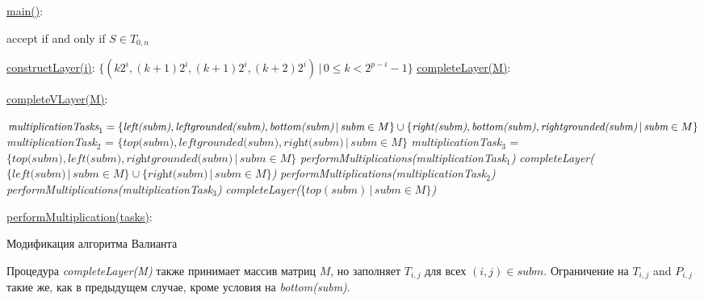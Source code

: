 \documentclass[14pt]{matmex-diploma-custom}
\begin{document}
\begin{algorithm}[!h]
\SetAlgoNoLine
{}
\underline{main()}{:}{

 accept if and only if $S \in T_{0, n}$
 \BlankLine
 }

\underline{constructLayer(i)}{:}{
 \BlankLine
 $\{(k2^i, (k+1)2^i, (k + 1)2^i, (k+2)2^i) \, |\, 0 \le k < 2^{p - i} - 1\}$
 \BlankLine
    }
\underline{completeLayer(M)}{:}{
\BlankLine
{}
\BlankLine
}

\underline{completeVLayer(M)}{:}{
 \BlankLine
 $\textit{multiplicationTasks}_1 = \linebreak
    \{\textit{left(subm)}, \textit{leftgrounded(subm)}, \textit{bottom(subm)}\, 
    |\,\textit{subm} \in M \} \cup \linebreak  \{\textit{right(subm)}, \textit{bottom(subm)}, \textit{rightgrounded(subm)}\, |\,\textit{subm} \in M\}$\;
 \BlankLine
 \textit{multiplicationTask$_2$} = $\{\textit{top(subm)}, \textit{leftgrounded(subm)}, \textit{right(subm)}\, |\,\textit{subm} \in M\}$\;
 \BlankLine
 \textit{multiplicationTask$_3$} = $\{\textit{top(subm)}, \textit{left(subm)}, \textit{rightgrounded(subm)}\, |\,\textit{subm} \in M\}$\;
 \BlankLine
 \textit{performMultiplications(multiplicationTask$_1$)}\;
 \textit{completeLayer($\{\textit{left(subm)}\, |\,subm \in M \} \cup \{\textit{right(subm)}\, |\,\textit{subm} \in M \}$)}\;
 \textit{performMultiplications(multiplicationTask$_2$)}\;
 \textit{performMultiplications(multiplicationTask$_3$)}\;
 \textit{completeLayer($\{top(subm)\, |\,subm \in M \}$)}

 }
 \BlankLine

 \underline{performMultiplication(tasks)}{:}{\\
 }

\caption{Модификация алгоритма Валианта}
\label{algo:modified}
\end{algorithm}

Процедура \textit{completeLayer(M)} также принимает массив матриц $M$, но заполняет $T_{i, j}$ для всех $(i, j) \in subm$.
Ограничение на $T_{i, j}$  and $P_{i, j}$ такие же, как в предыдущем случае, кроме условия на \textit{bottom(subm)}.
\end{document}
